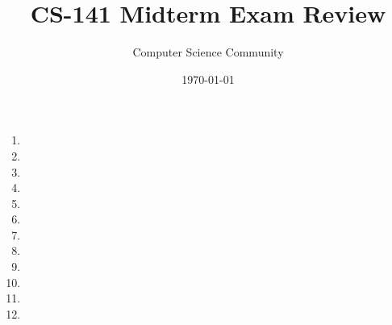 \documentclass[11pt]{article}
\title{CS-141 Midterm Exam Review}
\author{Computer Science Community}
\date{\today}
\begin{document}
\header

\begin{enumerate}
	\item 

\pagebreak
    \item 
	
	\vspace{.25in}
    \item 

 	\vspace{.25in}
 	\item 
 	
 \pagebreak
     \item 
 \vfill
 
 \pagebreak
     \item 
     
     \item 

\pagebreak
	\item 
	
\newpage
	\item 

	\vspace{.25in}
	\item 

\newpage
	\item 
    \item 

\end{enumerate}
\end{document}
